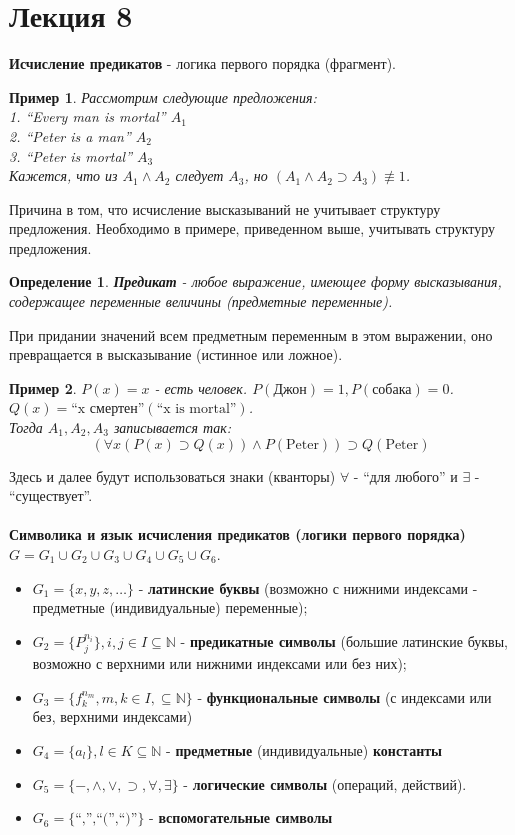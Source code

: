 \documentclass{article}
\newtheorem{example}{Пример}
\newtheorem{definition}{Определение}
\numberwithin{example}{section}
\numberwithin{question}{section}
\numberwithin{Remark}{section}
\numberwithin{theorem}{section}
\numberwithin{definition}{section}
\numberwithin{proposition}{section}
\begin{document}
\section{Лекция 8}
\textbf{Исчисление предикатов} - логика первого порядка (фрагмент).
\begin{example}
Рассмотрим следующие предложения:\\
1. ``Every man is mortal'' $A_1$\\
2. ``Peter is a man'' $A_2$\\
3. ``Peter is mortal'' $A_3$\\
Кажется, что из $A_1\wedge A_2$ следует $A_3$, но $(A_1\wedge A_2\supset A_3)\not\equiv 1$. 
\end{example}
Причина в том, что исчисление высказываний не учитывает структуру предложения. Необходимо в примере, приведенном выше, учитывать структуру предложения.
\begin{definition}
\textbf{Предикат} - любое выражение, имеющее форму высказывания, содержащее переменные величины (предметные переменные).
\end{definition}
При придании значений всем предметным переменным в этом выражении, оно превращается в высказывание (истинное или ложное).
\begin{example}
	$P(x)=x$  - есть человек. $P(\text{Джон})=1,P(\text{собака})=0$. $Q(x)= \text{``x смертен''}(\text{``x is mortal''})$.\\
	Тогда $A_1,A_2,A_3$ записывается так:
	\begin{equation*}
	(\forall x(P(x)\supset Q(x))\wedge P(\text{Peter}))\supset Q(\text{Peter})
	\end{equation*}
\end{example}
Здесь и далее будут использоваться знаки (кванторы) $\forall$ - ``для любого'' и $\exists$ - ``существует''.\\
\\
\textbf{Символика и язык исчисления предикатов (логики первого порядка)}\\
$G=G_1\cup G_2\cup G_3\cup G_4\cup G_5\cup G_6$. \\
\begin{itemize}
	\item $G_1=\{x,y,z,\ldots \}$ - \textbf{латинские буквы} (возможно с нижними индексами - предметные (индивидуальные) переменные);
	\item $G_2=\{P_j^{n_i}\},i,j\in I\subseteq \mathbb{N}$ - \textbf{предикатные символы} (большие латинские буквы, возможно с верхними или нижними индексами или без них);
	\item $G_3=\{f_k^{n_m},m,k\in I,\subseteq\mathbb{N} \}$ - \textbf{функциональные символы} (с индексами или без, верхними индексами)
	\item $G_4=\{a_l \},l\in K\subseteq \mathbb{N}$ -\textbf{ предметные} (индивидуальные) \textbf{константы}
	\item $G_5=\{-,\wedge,\vee ,\supset,\forall, \exists \}$ - \textbf{логические символы} (операций, действий).
	\item $G_6=\{\text{``,'',``('',``)''} \}$ - \textbf{вспомогательные символы}
\end{itemize}
\end{document}
